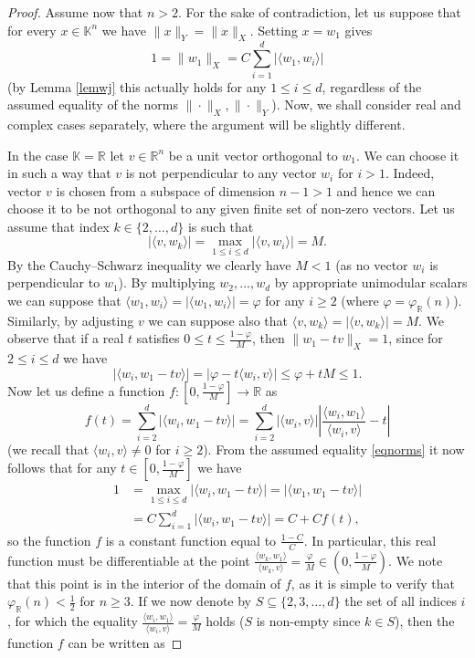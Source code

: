 \documentclass[12pt, reqno]{amsart}
\theoremstyle{definition}
\theoremstyle{remark}
\numberwithin{equation}{section}
\begin{document}
\begin{proof}
Assume now that $n>2$. For the sake of contradiction, let us suppose that for every $x \in \mathbb{K}^n$ we have $\|x\|_Y = \|x\|_X$. Setting $x=w_1$ gives
$$1=\|w_1\|_X = C \sum_{i=1}^{d} |\langle w_1, w_i\rangle|$$
(by Lemma \ref{lemwj} this actually holds for any $1 \leq i \leq d$, regardless of the assumed equality of the norms $\| \cdot \|_X, \| \cdot \|_Y$). Now, we shall consider real and complex cases separately, where the argument will be slightly different.

In the case $\mathbb{K}=\mathbb{R}$ let $v \in \mathbb{R}^n$ be a unit vector orthogonal to $w_1$. We can choose it in such a way that $v$ is not perpendicular to any vector $w_i$ for $i>1$. Indeed, vector $v$ is chosen from a subspace of dimension $n-1>1$ and hence we can choose it to be not orthogonal to any given finite set of non-zero vectors. Let us assume that index $k \in \{2, \ldots, d\}$ is such that 
$$|\langle v, w_k \rangle | = \max_{1 \leq i \leq d} | \langle v, w_i \rangle |=M.$$
By the Cauchy--Schwarz inequality we clearly have $M<1$ (as no vector $w_i$ is perpendicular to $w_1$). By multiplying $w_2, \ldots, w_d$ by appropriate unimodular scalars we can suppose that $\langle w_1, w_i \rangle = |\langle w_1, w_i \rangle | = \varphi$ for any $i \geq 2$ (where $\varphi=\varphi_{\mathbb{R}}(n)$). Similarly, by adjusting $v$ we can suppose also that $\langle v, w_k \rangle =|\langle v, w_k \rangle |=M$. We observe that if a real $t$ satisfies $0 \leq t \leq \frac{1-\varphi}{M}$, then $\|w_1-tv\|_X=1$, since for $2 \leq i \leq d$ we have
$$|\langle w_i, w_1 - tv \rangle | = | \varphi - t\langle w_i, v \rangle| \leq \varphi + tM \leq 1.$$
Now let us define a function $f: \left [0, \frac{1-\varphi}{M} \right ] \to \mathbb{R}$ as
$$f(t) = \sum_{i=2}^{d} |\langle w_i, w_1 - tv \rangle | = \sum_{i=2}^{d} |\langle w_i, v \rangle | \left |\frac{\langle w_i, w_1 \rangle}{\langle w_i, v \rangle } - t \right |$$
(we recall that $\langle w_i, v \rangle \neq 0$ for $i \geq 2$). From the assumed equality  \eqref{eqnorms} it now follows that for any $t \in \left [0, \frac{1-\varphi}{M} \right ]$ we have
\begin{equation}
\label{maxfunc}
\begin{split}
1 &=  \max_{1 \leq i \leq d} |\langle w_i, w_1-tv \rangle| = |\langle w_1, w_1-tv \rangle| \\
&= C  \sum_{i=1}^{d} | \langle w_i, w_1-tv \rangle | = C + Cf(t),
\end{split}
\end{equation}
so the function $f$ is a constant function equal to $\frac{1-C}{C}$. In particular, this real function must be differentiable at the point $\frac{\langle w_k, w_1 \rangle}{\langle w_k, v \rangle } = \frac{\varphi}{M} \in \left (0, \frac{1-\varphi}{M} \right )$. We note that this point is in the interior of the domain of $f$, as it is simple to verify that $\varphi_{\mathbb{R}}(n) < \frac{1}{2}$ for $n \geq 3$. If we now denote by $S \subseteq \{2, 3, \ldots, d\}$ the set of all indices $i$, for which the equality $\frac{\langle w_i, w_1 \rangle}{\langle w_i, v \rangle } = \frac{\varphi}{M}$ holds ($S$ is non-empty since $k \in S$), then the function $f$ can be written as

\end{proof}
\end{document}
